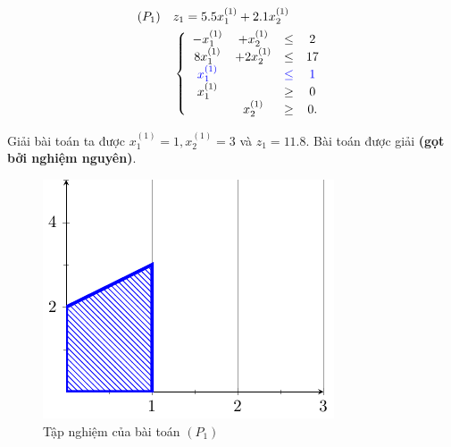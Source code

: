 \documentclass[10pt]{beamer}
\begin{document}
\begin{frame}
    \begin{equation*}
        \begin{split}
            (P_1) \quad &z_1= 5.5x^{(1)}_1 + 2.1x^{(1)}_2 \\
            & \left\{\begin{array} {cccc}
            -x^{(1)}_1 &+ x^{(1)}_2 &\leq& 2 \\
            8x^{(1)}_1 &+ 2x^{(1)}_2 &\leq& 17 \\
            \color{blue} x^{(1)}_1 && \color{blue} \leq &\color{blue} 1 \\
            x^{(1)}_1 &&\geq& 0 \\
            &x^{(1)}_2 &\geq& 0. \\
            \end{array}\right. \\
        \end{split}
    \end{equation*}
\end{frame}

\begin{frame}
    Giải bài toán ta được $x^{(1)}_1=1, x^{(1)}_2=3$ và $z_1=11.8$. Bài toán được giải \textbf{(gọt bởi nghiệm nguyên)}.
    \vspace{0.5cm}
    \begin{figure}[h]
        \centering
        \includegraphics[width=0.4\linewidth]{hinh2.pdf}
        \caption{Tập nghiệm của bài toán $(P_1)$}
    \end{figure}
\end{frame}
\end{document}
